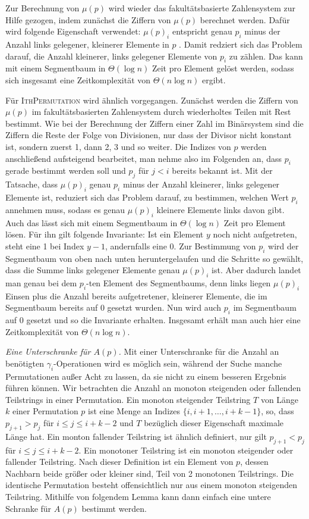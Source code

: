 \documentclass[a4paper, 11pt, ngerman]{article}
\begin{document}
Zur Berechnung von $\mu(p)$ wird wieder das fakultätsbasierte Zahlensystem zur Hilfe gezogen, indem zunächst die Ziffern von $\mu(p)$ berechnet werden. Dafür wird folgende Eigenschaft verwendet: $\mu(p)_i$ entspricht genau $p_i$ minus der Anzahl links gelegener, kleinerer Elemente in $p$ \cite{permutationranking}. Damit redziert sich das Problem darauf, die Anzahl kleinerer, links gelegener Elemente von $p_i$ zu zählen. Das kann mit einem Segmentbaum in $\Theta(\log n)$ Zeit pro Element gelöst werden, sodass sich insgesamt eine Zeitkomplexität von $\Theta(n \log n)$ ergibt.

Für \textsc{IthPermutation} wird ähnlich vorgegangen. Zunächst werden die Ziffern von $\mu(p)$ im fakultätsbasierten Zahlensystem durch wiederholtes Teilen mit Rest bestimmt. Wie bei der Berechnung der Ziffern einer Zahl im Binärsystem sind die Ziffern die Reste der Folge von Divisionen, nur dass der Divisor nicht konstant ist, sondern zuerst 1, dann 2, 3 und so weiter. Die Indizes von $p$ werden anschließend aufsteigend bearbeitet, man nehme also im Folgenden an, dass $p_i$ gerade bestimmt werden soll und $p_j$ für $j < i$ bereits bekannt ist. Mit der Tatsache, dass $\mu(p)_i$ genau $p_i$ minus der Anzahl kleinerer, links gelegener Elemente ist, reduziert sich das Problem darauf, zu bestimmen, welchen Wert $p_i$ annehmen muss, sodass es genau $\mu(p)_i$ kleinere Elemente links davon gibt. Auch das lässt sich mit einem Segmentbaum in $\Theta(\log n)$ Zeit pro Element lösen. Für ihn gilt folgende Invariante: Ist ein Element $y$ noch nicht aufgetreten, steht eine 1 bei Index $y-1$, andernfalls eine 0. Zur Bestimmung von $p_i$ wird der Segmentbaum von oben nach unten heruntergelaufen und die Schritte so gewählt, dass die Summe links gelegener Elemente genau $\mu(p)_i$ ist. Aber dadurch landet man genau bei dem $p_i$-ten Element des Segmentbaums, denn links liegen $\mu(p)_i$ Einsen plus die Anzahl bereits aufgetretener, kleinerer Elemente, die im Segmentbaum bereits auf 0 gesetzt wurden. Nun wird auch $p_i$ im Segmentbaum auf 0 gesetzt und so die Invariante erhalten. Insgesamt erhält man auch hier eine Zeitkomplexität von $\Theta(n \log n)$.
\bigskip

\noindent \emph{Eine Unterschranke für $A(p)$.} Mit einer Unterschranke für die Anzahl an benötigten $\gamma_i$-Operationen wird es möglich sein, während der Suche manche Permutationen außer Acht zu lassen, da sie nicht zu einem besseren Ergebnis führen können. Wir betrachten die Anzahl an monoton steigenden oder fallenden Teilstrings in einer Permutation. Ein monoton steigender Teilstring $T$ von Länge $k$ einer Permutation $p$ ist eine Menge an Indizes $\{i, i + 1, \dots, i + k - 1\}$, so, dass $p_{j+1} > p_j$ für $i \le j \le i+ k - 2$ und $T$ bezüglich dieser Eigenschaft maximale Länge hat. Ein monton fallender Teilstring ist ähnlich definiert, nur gilt $p_{j + 1} < p_j$ für $i \le j \le i + k - 2$. Ein monotoner Teilstring ist ein monoton steigender oder fallender Teilstring. Nach dieser Definition ist ein Element von $p$, dessen Nachbarn beide größer oder kleiner sind, Teil von 2 monotonen Teilstrings. Die identische Permutation besteht offensichtlich nur aus einem monoton steigenden Teilstring. Mithilfe von folgendem Lemma kann dann einfach eine untere Schranke für $A(p)$ bestimmt werden.
\end{document}

